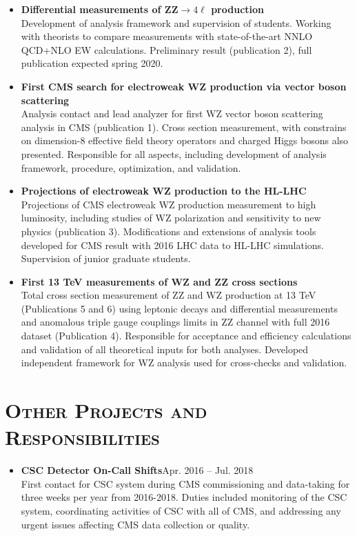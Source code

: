 \documentclass[10pt]{res} %
\begin{document}
\begin{resume}
\begin{itemize}
  \item\textbf{{Differential measurements of ZZ$\to4\ell$ production}} \\
    Development of analysis framework and supervision of students.
    Working with theorists to compare measurements with state-of-the-art NNLO QCD+NLO EW
    calculations. Preliminary result (publication 2), full publication expected spring 2020.
  \item\textbf{{First CMS search for electroweak WZ production via vector boson scattering}} \\
    Analysis contact and lead analyzer for first WZ vector boson scattering analysis in CMS (publication 1).
    Cross section measurement, with constrains on dimension-8 
    effective field theory operators and charged Higgs bosons also presented.
    Responsible for all aspects, 
    including development of analysis framework, procedure, optimization, and validation. 

  \item\textbf{{Projections of electroweak WZ production to the HL-LHC}} \\
    Projections of CMS electroweak WZ production measurement to high luminosity, including studies of
    WZ polarization and sensitivity to new physics (publication 3). 
    Modifications and extensions of analysis tools developed for CMS result with 2016 LHC data to 
    HL-LHC simulations. Supervision of junior graduate students.

  \item\textbf{{First 13 TeV measurements of WZ and ZZ cross sections}} \\
    Total cross section measurement 
    of ZZ and WZ production at 13 TeV (Publications 5 and 6) using leptonic decays
    and differential measurements and anomalous
    triple gauge couplings limits in ZZ channel
    with full 2016 dataset (Publication 4). 
    Responsible for acceptance
    and efficiency calculations and validation of all theoretical inputs for both analyses. 
    Developed independent framework for WZ analysis used for cross-checks and validation.

\end{itemize}

\section{\textsc{Other Projects and Responsibilities}}
\begin{itemize}
  \item\textbf{CSC Detector On-Call Shifts}\hfill{Apr. 2016 -- Jul. 2018} \\
    First contact for CSC system during CMS commissioning and data-taking for three weeks per year
    from 2016-2018. Duties included monitoring of the CSC system, coordinating activities of CSC with all of CMS, 
    and addressing any urgent issues affecting CMS data collection or quality.


\end{itemize}
\end{resume}
\end{document}
